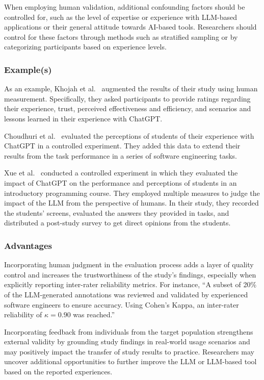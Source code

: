 When employing human validation, additional confounding factors should be controlled for, such as the level of expertise or experience with LLM-based applications or their general attitude towards AI-based tools.
Researchers should control for these factors through methods such as stratified sampling or by categorizing participants based on experience levels.

\subsubsection{Example(s)}

As an example, Khojah et al.~\cite{DBLP:journals/pacmse/KhojahM0N24} augmented the results of their study using human measurement.
Specifically, they asked participants to provide ratings regarding their experience, trust, perceived effectiveness and efficiency, and scenarios and lessons learned in their experience with ChatGPT.

Choudhuri et al.~\cite{DBLP:conf/icse/ChoudhuriLSGS24} evaluated the perceptions of students of their experience with ChatGPT in a controlled experiment.
They added this data to extend their results from the task performance in a series of software engineering tasks.

Xue et al.~\cite{DBLP:conf/icse/XueCBTH24} conducted a controlled experiment in which they evaluated the impact of ChatGPT on the performance and perceptions of students in an introductory programming course.
They employed multiple measures to judge the impact of the LLM from the perspective of humans.
In their study, they recorded the students' screens, evaluated the answers they provided in tasks, and distributed a post-study survey to get direct opinions from the students.


\subsubsection{Advantages}

Incorporating human judgment in the evaluation process adds a layer of quality control and increases the trustworthiness of the study’s findings, especially when explicitly reporting inter-rater reliability metrics. For instance, ``A subset of 20\% of the LLM-generated annotations was reviewed and validated by experienced software engineers to ensure accuracy. Using Cohen's Kappa, an inter-rater reliability of $\kappa = 0.90$ was reached.''

Incorporating feedback from individuals from the target population strengthens external validity by grounding study findings in real-world usage scenarios and may positively impact the transfer of study results to practice.
Researchers may uncover additional opportunities to further improve the LLM or LLM-based tool based on the reported experiences.

